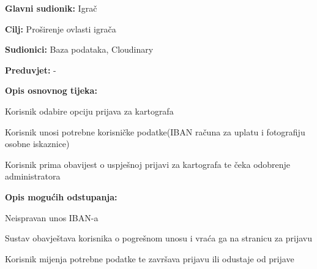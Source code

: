 					\noindent {}
					\begin{packed_item}
						
						\item \textbf{Glavni sudionik: }Igrač
						\item  \textbf{Cilj:} Proširenje ovlasti igrača
						\item  \textbf{Sudionici:} Baza podataka, Cloudinary
						\item  \textbf{Preduvjet:} -
						\item  \textbf{Opis osnovnog tijeka:}
						
						\item[] \begin{packed_enum}
							
							\item Korisnik odabire opciju prijava za kartografa
							\item Korisnik unosi potrebne korisničke podatke(IBAN računa za uplatu i fotografiju osobne iskaznice)
							\item Korisnik prima obavijest o uspješnoj prijavi za kartografa te čeka odobrenje administratora
						\end{packed_enum}
						
						\item  \textbf{Opis mogućih odstupanja:}
						
						\item[] \begin{packed_item}
							
							\item Neispravan unos IBAN-a
							\item[] \begin{packed_enum}
								
								\item Sustav obavještava korisnika o pogrešnom unosu i vraća ga na stranicu za prijavu
								\item Korisnik mijenja potrebne podatke te završava prijavu ili odustaje od prijave
								
							\end{packed_enum}
							
						\end{packed_item}
					\end{packed_item}
				
					\newpage
					
